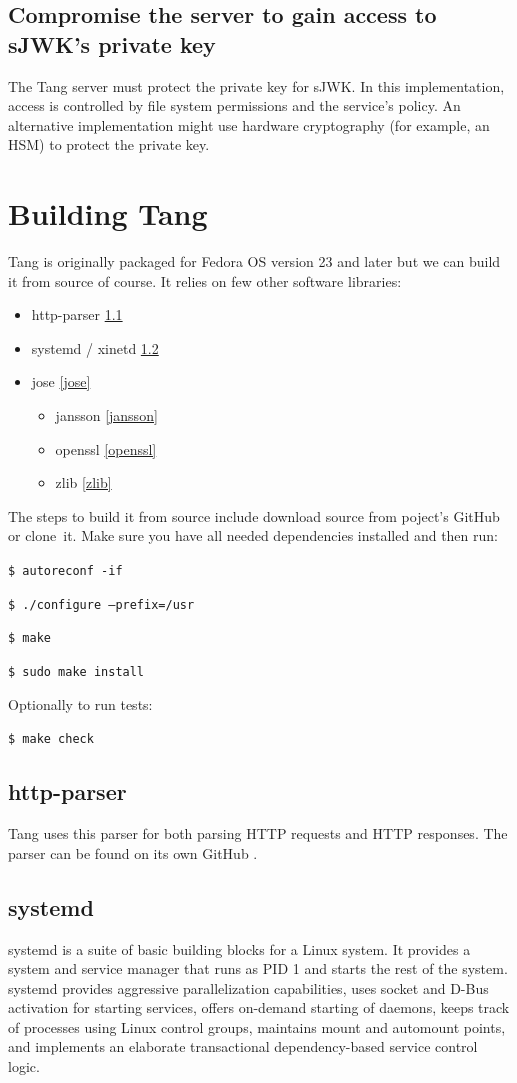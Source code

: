 \subsection{Compromise the server to gain access to sJWK's private key}
The Tang server must protect the private key for sJWK.
In this implementation, access is controlled by file system permissions and the service's policy.
An alternative implementation might use hardware cryptography (for example, an HSM) to protect the private key.
\section{Building Tang}

Tang is originally packaged for Fedora OS version 23 and later but we can build it from source of course.
It relies on few other software libraries:
\label{dependencies}
\begin{itemize}
\item http-parser \ref{http-parser}
\item systemd / xinetd \ref{systemd}
\item jose \ref{jose}
    \begin{itemize}
    \item jansson \ref{jansson}
    \item openssl \ref{openssl}
    \item zlib \ref{zlib}
    \end{itemize}
\end{itemize}

The steps to build it from source include download source from poject's GitHub or clone~it.
Make sure you have all needed dependencies installed and then run:

{\tt \$ autoreconf -if}

{\tt \$ ./configure --prefix=/usr}

{\tt \$ make}

{\tt \$ sudo make install}

Optionally to run tests:

{\tt \$ make check}

\subsection{http-parser}\label{http-parser}
Tang uses this parser for both parsing HTTP requests and HTTP responses.
The parser can be found on its own GitHub \cite{http-parser}.

\subsection{systemd}\label{systemd}
systemd is a suite of basic building blocks for a Linux system.
It provides a system and service manager that runs as PID 1 and starts the rest of the system.
systemd provides aggressive parallelization capabilities, uses socket and D-Bus activation for starting services,
 offers on-demand starting of daemons, keeps track of processes using Linux control groups, maintains mount and automount points,
 and implements an elaborate transactional dependency-based service control logic.

